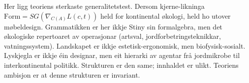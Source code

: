 Her ligg teoriens sterkaste generalitetstest. Dersom kjerne-likninga $\mathrm{Form} = SG(\nabla_{C(A)} L(c,t))$ held for kontinental økologi, held ho utover møbeldesign. Grammatikken er her ikkje Stiny sin formalgebra, men det økologiske repertoaret av operasjonar (artsval, jordforbetringsteknikkar, vatningssystem). Landskapet er ikkje estetisk-ergonomisk, men biofysisk-sosialt. Lyskjegla er ikkje éin designar, men eit hierarki av agentar frå jordmikrobe til interkontinental politikk. Strukturen er den same; innhaldet er ulikt. Teoriens ambisjon er at denne strukturen er invariant.
